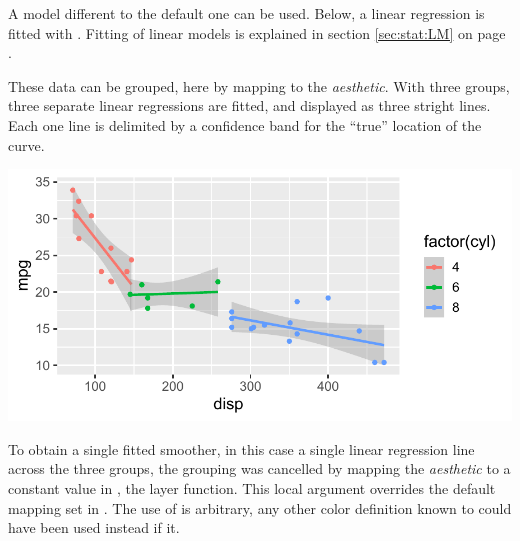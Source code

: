 \documentclass[krantz2]{krantz}\usepackage{knitr}
\begin{document}
A model different to the default one can be used. Below, a linear regression is fitted with . Fitting of linear models is explained in section \ref{sec:stat:LM} on page \pageref{sec:stat:LM}.

\begin{knitrout}\footnotesize
{}\color{fgcolor}\begin{kframe}
\begin{alltt}
 \hlopt{+} \hlstd{(} \hlstd{=} \hlstd{,}   \hlopt{~} 
\end{alltt}
\end{kframe}
\end{knitrout}

These data can be grouped, here by mapping  to the  \emph{aesthetic}. With three groups, three separate linear regressions are fitted, and displayed as three stright lines. Each one line is delimited by a confidence band for the ``true'' location of the curve.

\begin{knitrout}\footnotesize
{}\color{fgcolor}\begin{kframe}
\begin{alltt}
 \hlopt{+} \hlstd{(} \hlstd{=}  \hlopt{+}
  \hlstd{(} \hlstd{=} \hlstd{,}   \hlopt{~} 
\end{alltt}
\end{kframe}

{\centering \includegraphics[width=.7\textwidth]{figure/pos-smooth-plot-04-1} 

}


\end{knitrout}

To obtain a single fitted smoother, in this case a single linear regression line across the three groups, the grouping was cancelled by mapping the  \emph{aesthetic} to a constant value in , the layer function. This local argument overrides the default  mapping set in . The use of  is arbitrary, any other color definition known to \Rlang could have been used instead if it.
\end{document}
